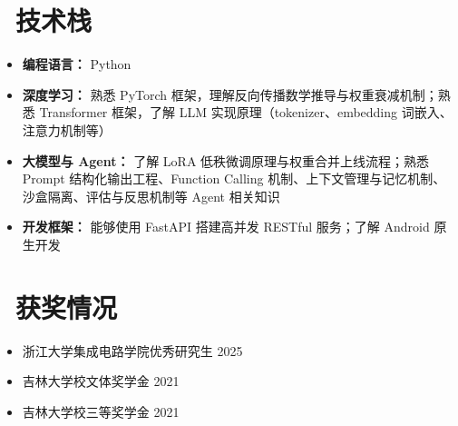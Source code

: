 \documentclass[11pt]{article}
\begin{document}
\section{\makebox[\widthof{\faCogs}][c]{\color{CVBlue}\faCogs}\ 技术栈}
\begin{itemize}[nosep]
    \item \textbf{编程语言：} Python
    \item \textbf{深度学习：} 熟悉 PyTorch 框架，理解反向传播数学推导与权重衰减机制；熟悉 Transformer 框架，了解 LLM 实现原理（tokenizer、embedding 词嵌入、注意力机制等）
    \item \textbf{大模型与 Agent：} 了解 LoRA 低秩微调原理与权重合并上线流程；熟悉 Prompt 结构化输出工程、Function Calling 机制、上下文管理与记忆机制、沙盒隔离、评估与反思机制等 Agent 相关知识
    \item \textbf{开发框架：} 能够使用 FastAPI 搭建高并发 RESTful 服务；了解 Android 原生开发
\end{itemize}

\section{\makebox[\widthof{\faGraduationCap}][c]{\color{CVBlue}\faList}\ 获奖情况}
\begin{itemize}
    \item 浙江大学集成电路学院优秀研究生 \hfill 2025
    \item 吉林大学校文体奖学金 \hfill 2021
    \item 吉林大学校三等奖学金 \hfill 2021
\end{itemize}
    
\end{document}
